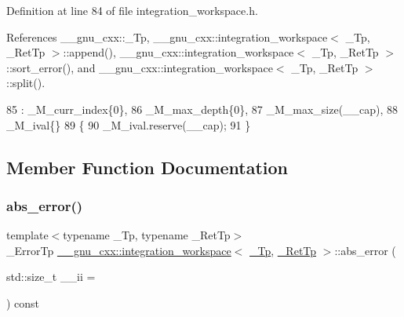 Definition at line 84 of file integration\+\_\+workspace.\+h.



References \+\_\+\+\_\+gnu\+\_\+cxx\+::\+\_\+\+Tp, \+\_\+\+\_\+gnu\+\_\+cxx\+::integration\+\_\+workspace$<$ \+\_\+\+Tp, \+\_\+\+Ret\+Tp $>$\+::append(), \+\_\+\+\_\+gnu\+\_\+cxx\+::integration\+\_\+workspace$<$ \+\_\+\+Tp, \+\_\+\+Ret\+Tp $>$\+::sort\+\_\+error(), and \+\_\+\+\_\+gnu\+\_\+cxx\+::integration\+\_\+workspace$<$ \+\_\+\+Tp, \+\_\+\+Ret\+Tp $>$\+::split().


\begin{DoxyCode}
85       : \_M\_curr\_index\{0\},
86         \_M\_max\_depth\{0\},
87         \_M\_max\_size(\_\_cap),
88         \_M\_ival\{\}
89       \{
90         \_M\_ival.reserve(\_\_cap);
91       \}
\end{DoxyCode}


\subsection{Member Function Documentation}
\mbox{\label{class____gnu__cxx_1_1integration__workspace_afccedf7d2f55c7e0b8c23d66f644bf05}} 
\subsubsection{\texorpdfstring{abs\+\_\+error()}{abs\_error()}}
{\footnotesize\ttfamily template$<$typename \+\_\+\+Tp, typename \+\_\+\+Ret\+Tp$>$ \\
\+\_\+\+Error\+Tp \hyperlink{class____gnu__cxx_1_1integration__workspace}{\+\_\+\+\_\+gnu\+\_\+cxx\+::integration\+\_\+workspace}$<$ \hyperlink{namespace____gnu__cxx_a3b19a9c800ca194374ef9172290f7d79}{\+\_\+\+Tp}, \hyperlink{namespace____gnu__cxx_a886e03ece3d53ff7fa6c098a40f93fa5}{\+\_\+\+Ret\+Tp} $>$\+::abs\+\_\+error (\begin{DoxyParamCaption}\item[{std\+::size\+\_\+t}]{\+\_\+\+\_\+ii = {} }\end{DoxyParamCaption}) const\hspace{0.3cm}{\ttfamily [inline]}}

